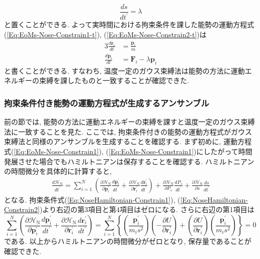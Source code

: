 \begin{equation}
    \frac{ds}{dt^{\prime}} = \lambda
\end{equation}
と置くことができる. 
よって実時間における拘束条件を課した能勢の運動方程式(\ref{Eq:EoMs-Nose-Constrain1-t}), (\ref{Eq:EoMs-Nose-Constrain2-t})は
\begin{alignat}{3}
    \frac{d \bm{r}_{i}}{dt}
    &=
    \frac{\bm{p}_{i}}{m}
    \\
    \frac{d \bm{p}_{i}}{dt}
    &=
    \bm{F}_{i} - \lambda \bm{p}_{i}
\end{alignat}
と書くことができる.
すなわち, 温度一定のガウス束縛法は能勢の方法に運動エネルギーの束縛を課したものと一致することが確認できた.

\subsubsection{拘束条件付き能勢の運動方程式が生成するアンサンブル}
前の節では, 能勢の方法に運動エネルギーの束縛を課すと温度一定のガウス束縛法に一致することを見た.
ここでは, 拘束条件付きの能勢の運動方程式がガウス束縛法と同様のアンサンブルを生成することを確認する.
まず初めに, 運動方程式(\ref{Eq:EoMs-Nose-Constrain1}), (\ref{Eq:EoMs-Nose-Constrain1})にしたがって時間発展させた場合でもハミルトニアンは保存することを確認する.
ハミルトニアンの時間微分を具体的に計算すると,
\begin{align}
    \frac{d \mathcal{H}_{\mathrm{N}}}{dt^{\prime}}
    =
    \sum_{i=1}^{N}
    \left(
        \frac{\partial \mathcal{H}_{\mathrm{N}}}{\partial \bm{p}_{i}^{\prime}}
        \frac{d \bm{p}_{i}^{\prime}}{dt^{\prime}}
        +
        \frac{\partial \mathcal{H}_{\mathrm{N}}}{\partial \bm{r}_{i}^{\prime}}
        \frac{d \bm{r}_{i}^{\prime}}{dt^{\prime}}
    \right)
    +
    \frac{\partial \mathcal{H}_{\mathrm{N}}}{\partial P_{s}}
    \frac{d P_{s}}{dt^{\prime}}
    +
    \frac{\partial \mathcal{H}_{\mathrm{N}}}{\partial s}
    \frac{d s}{dt^{\prime}}
\end{align}
となる. 拘束条件式(\ref{Eq:NoseHamiltonian-Constrain1}), (\ref{Eq:NoseHamiltonian-Constrain2})より右辺の第3項目と第4項目はゼロになる.
さらに右辺の第1項目は
\begin{equation}
    \sum_{i=1}^{N}
    \left(
        \frac{\partial \mathcal{H}_{\mathrm{N}}}{\partial \bm{p}_{i}^{\prime}}
        \frac{d \bm{p}_{i}^{\prime}}{dt^{\prime}}
        +
        \frac{\partial \mathcal{H}_{\mathrm{N}}}{\partial \bm{r}_{i}^{\prime}}
        \frac{d \bm{r}_{i}^{\prime}}{dt^{\prime}}
    \right)
    =
    \sum_{i=1}^{N}
    \left\{
        \left(
            \frac{\bm{p}_{i}^{\prime}}{m_{i}s^{2}}
        \right)
        \left(
            -\frac{\partial U}{\partial \bm{r}_{i}^{\prime}}
        \right)
        +
        \left(
            \frac{\partial U}{\partial \bm{r}_{i}^{\prime}}
        \right)
        \left(
            \frac{\bm{p}_{i}^{\prime}}{m_{i}s^{2}}
        \right)
    \right\}
    =
    0
\end{equation}
である. 以上からハミルトニアンの時間微分がゼロとなり, 保存量であることが確認できた.

